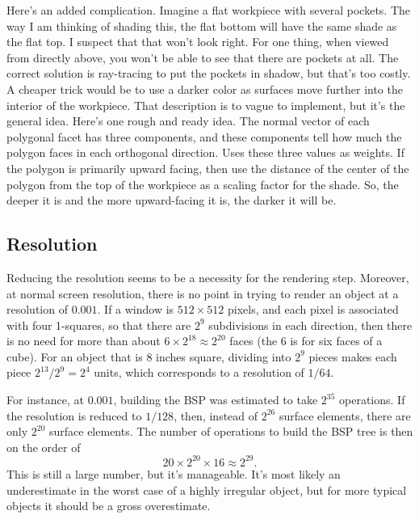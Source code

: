 \documentclass[titlepage,oneside,10pt]{article}
\begin{document}
Here's an added complication. Imagine a flat workpiece with several
pockets. The way I am thinking of shading this, the flat bottom will
have the same shade as the flat top. I suspect that that won't look
right. For one thing, when viewed from directly above, you won't be
able to see that there are pockets at all. The correct solution is
ray-tracing to put the pockets in shadow, but that's too costly. A
cheaper trick would be to use a darker color as surfaces move further
into the interior of the workpiece. That description is to vague to
implement, but it's the general idea. Here's one rough and ready
idea. The normal vector of each polygonal facet has three components,
and these components tell how much the polygon faces in each
orthogonal direction. Uses these three values as weights. If the
polygon is primarily upward facing, then use the distance of the
center of the polygon from the top of the workpiece as a scaling
factor for the shade. So, the deeper it is and the more upward-facing
it is, the darker it will be.

\subsection{Resolution}

Reducing the resolution seems to be a necessity for the rendering
step. Moreover, at normal screen resolution, there is no point in
trying to render an object at a resolution of $0.001$. If a window is
$512\times 512$ pixels, and each pixel is associated with four
1-squares, so that there are $2^9$ subdivisions in each direction,
then there is no need for more than about $6\times 
2^{18}\approx 2^{20}$ faces (the 6 is for six faces of a cube). For an
object that is 8 inches square, dividing into $2^9$ pieces makes each
piece $2^{13}/2^9 = 2^4$ units, which corresponds to a resolution of
$1/64$.

For instance, at $0.001$, building the BSP was estimated to take
$2^{35}$ operations. If the resolution is reduced to $1/128$, then,
instead of $2^{26}$ surface elements, there are only $2^{20}$ surface
elements. The number of operations to build the BSP tree is then on
the order of
$$20\times 2^{20}\times 16\approx 2^{29}.$$
This is still a large number, but it's manageable. It's most likely an
underestimate in the worst case of a highly irregular object, but for
more typical objects it should be a gross overestimate.
\end{document}

